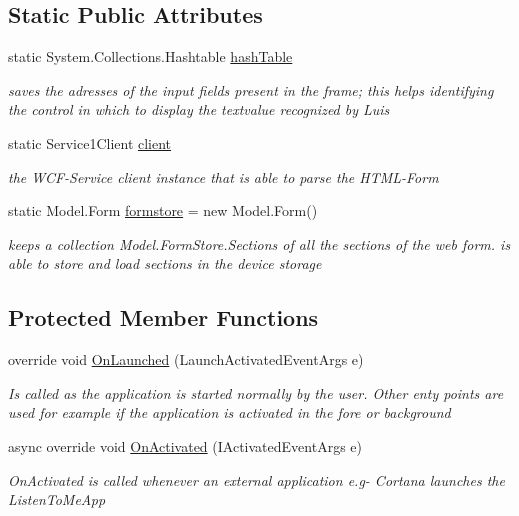\subsection*{Static Public Attributes}
\begin{DoxyCompactItemize}
\item 
static System.\+Collections.\+Hashtable \hyperlink{class_listen_to_me_1_1_app_a311ccaa1ae0fd9cf9f89d3e3466098fe}{hash\+Table}
\begin{DoxyCompactList}\small\item\em saves the adresses of the input fields present in the frame; this helps identifying the control in which to display the textvalue recognized by Luis \end{DoxyCompactList}\item 
static Service1\+Client \hyperlink{class_listen_to_me_1_1_app_a41b762ac78fada5d35954d39419b8e36}{client}
\begin{DoxyCompactList}\small\item\em the W\+C\+F-\/\+Service client instance that is able to parse the H\+T\+M\+L-\/\+Form \end{DoxyCompactList}\item 
static Model.\+Form \hyperlink{class_listen_to_me_1_1_app_a3e094e220103fe4590cf50c22f38ee65}{formstore} = new Model.\+Form()
\begin{DoxyCompactList}\small\item\em keeps a collection Model.\+Form\+Store.\+Sections of all the sections of the web form. is able to store and load sections in the device storage \end{DoxyCompactList}\end{DoxyCompactItemize}
\subsection*{Protected Member Functions}
\begin{DoxyCompactItemize}
\item 
override void \hyperlink{class_listen_to_me_1_1_app_ace89a3624e2de8cc528dea8b1288d03f}{On\+Launched} (Launch\+Activated\+Event\+Args e)
\begin{DoxyCompactList}\small\item\em Is called as the application is started normally by the user. Other enty points are used for example if the application is activated in the fore or background \end{DoxyCompactList}\item 
async override void \hyperlink{class_listen_to_me_1_1_app_a3e2da49bb555b7fdc5858f5442d396e4}{On\+Activated} (I\+Activated\+Event\+Args e)
\begin{DoxyCompactList}\small\item\em On\+Activated is called whenever an external application e.\+g-\/ Cortana launches the Listen\+To\+Me\+App \end{DoxyCompactList}\end{DoxyCompactItemize}

